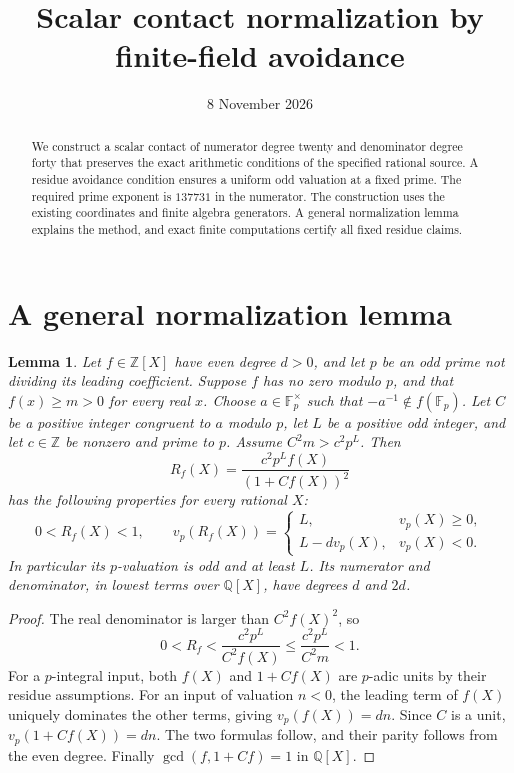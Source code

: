 \documentclass[11pt,a4paper]{article}
\title{Scalar contact normalization by finite-field avoidance}
\author{}\date{8 November 2026}
\newtheorem{lemma}[theorem]{Lemma}
\newcommand{\Q}{\mathbb Q}\newcommand{\Z}{\mathbb Z}
\begin{document}
\maketitle
\begin{abstract}
We construct a scalar contact of numerator degree twenty and
denominator degree forty that preserves the exact arithmetic
conditions of the specified rational source. A residue avoidance
condition ensures a uniform odd valuation at a fixed prime.
The required prime exponent is $137731$ in the numerator. The
construction uses the existing coordinates and finite algebra
generators. A general normalization lemma explains the method,
and exact finite computations certify all fixed residue claims.
\end{abstract}

\section{A general normalization lemma}

\begin{lemma}\label{lem:general}
Let $f\in\Z[X]$ have even degree $d>0$, and let $p$ be an odd
prime not dividing its leading coefficient. Suppose $f$ has no
zero modulo $p$, and that $f(x)\ge m>0$ for every real $x$.
Choose $a\in\mathbb F_p^\times$ such that
$-a^{-1}\notin f(\mathbb F_p)$. Let $C$ be a positive integer
congruent to $a$ modulo $p$, let $L$ be a positive odd integer,
and let $c\in\Z$ be nonzero and prime to $p$. Assume
$C^2m>c^2p^L$. Then
\[
 R_f(X)=\frac{c^2p^L f(X)}{(1+C f(X))^2}
\]
has the following properties for every rational $X$:
\[
 0<R_f(X)<1,\qquad
 v_p(R_f(X))=
 \begin{cases}
 L,&v_p(X)\ge0,\\
 L-dv_p(X),&v_p(X)<0.
 \end{cases}
\]
In particular its $p$-valuation is odd and at least $L$.
Its numerator and denominator, in lowest terms over $\Q[X]$,
have degrees $d$ and $2d$.
\end{lemma}
\begin{proof}
The real denominator is larger than $C^2f(X)^2$, so
\[
 0<R_f<\frac{c^2p^L}{C^2f(X)}
       \le\frac{c^2p^L}{C^2m}<1.
\]
For a $p$-integral input, both $f(X)$ and $1+Cf(X)$ are
$p$-adic units by their residue assumptions. For an input of
valuation $n<0$, the leading term of $f(X)$ uniquely dominates
the other terms, giving $v_p(f(X))=dn$. Since $C$ is a unit,
$v_p(1+Cf(X))=dn$. The two formulas follow, and their parity
follows from the even degree. Finally
$\gcd(f,1+Cf)=1$ in $\Q[X]$.
\end{proof}
\end{document}
